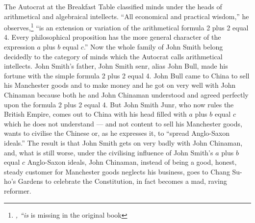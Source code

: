 The Autocrat at the Breakfast Table classified minds under the heads of arithmetical and algebraical intellects.
``All economical and practical wisdom,'' he observes,\footnote{\emph{, ``is} is missing in the original book} ``is an extension or variation of the arithmetical formula 2 plus 2 equal 4. 
Every philosophical proposition has the more general character of the expression $a$ plus $b$ equal $c$.''
Now the whole family of John Smith belong decidedly to the category of minds which the Autocrat calls arithmetical intellects.
John Smith's father, John Smith senr, alias John Bull, made his fortune with the simple formula 2 plus 2 equal 4.
John Bull came to China to sell his Manchester goods and to make money and he got on very well with John Chinaman because both he and John Chinaman understood and agreed perfectly upon the formula 2 plus 2 equal 4.
But John Smith Junr, who now rules the British Empire, comes out to China with his head filled with $a$ plus $b$ equal $c$ which he does not understand --- and not content to sell his Manchester goods, wants to civilise the Chinese or, as he expresses it, to ``spread Anglo-Saxon ideals.''
The result is that John Smith gets on very badly with John Chinaman, and, what is still worse, under the civilising influence of John Smith's $a$ plus $b$ equal $c$ Anglo-Saxon ideals, John Chinaman, instead of being a good, honest, steady customer for Manchester goods neglects his business, goes to Chang Su-ho's Gardens to celebrate the Constitution, in fact becomes a mad, raving reformer.

